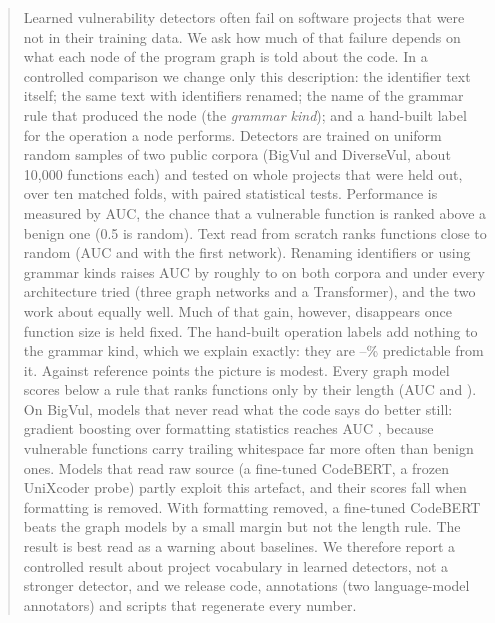 \begin{abstract}
Learned vulnerability detectors often fail on software projects that were not
in their training data. We ask how much of that failure depends on what each
node of the program graph is told about the code. In a controlled comparison
we change only this description: the identifier text itself; the same text with
identifiers renamed; the name of the grammar rule that produced the node (the
\emph{grammar kind}); and a hand-built label for the operation a node performs.
Detectors are trained on uniform random samples of two public corpora (BigVul
and DiverseVul, about 10{,}000 functions each) and tested on whole projects
that were held out, over ten matched folds, with paired statistical tests.
Performance is measured by AUC, the chance that a vulnerable function is ranked
above a benign one (0.5 is random). Text read from scratch ranks functions
close to random (AUC \mBvGgnnLexAuc{} and \mDvGgnnLexAuc{} with the first network). Renaming identifiers or using grammar
kinds raises AUC by roughly \numdeltaMin{} to \numdeltaMax{} on both corpora and under every
architecture tried (three graph networks and a Transformer), and the two work
about equally well. Much of that gain,
however, disappears once function size is held fixed. The hand-built operation
labels add nothing to the grammar kind, which we explain exactly: they are
\numdeterminismMin{}--\numdeterminismMax{}\% predictable from it. Against reference points the
picture is modest. Every graph model scores below a rule that ranks functions
only by their length (AUC \numbvSizeAuc{} and \numdvSizeAuc{}). On BigVul, models
that never read what the code says do better still: gradient boosting over
formatting statistics reaches AUC \rBvFormatAuc{}, because vulnerable functions
carry trailing whitespace far more often than benign ones. Models that read raw
source (a fine-tuned CodeBERT, a frozen UniXcoder probe) partly exploit this
artefact, and their scores fall when formatting is removed. With formatting
removed, a fine-tuned CodeBERT beats the graph models by a small margin but not
the length rule. The result is best read as a warning about baselines. We therefore
report a controlled result about project vocabulary in learned detectors, not a
stronger detector, and we release code, annotations (two language-model annotators) and scripts that regenerate
every number.
\end{abstract}
